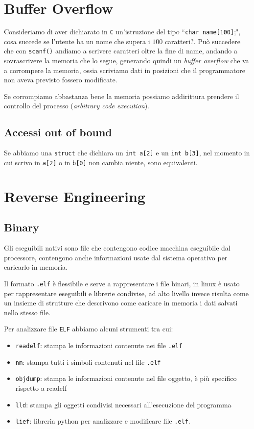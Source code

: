 \documentclass[oneside,a4paper,11pt]{book}
\theoremstyle{italicstyle}
\theoremstyle{normStyle}
\begin{document}
\section{Buffer Overflow}
Consideriamo di aver dichiarato in \texttt{C} un'istruzione del tipo ``\texttt{char name[100]};",
cosa succede se l'utente ha un nome che supera i $100$ caratteri?.
Può succedere che con \texttt{scanf()} andiamo a scrivere caratteri oltre la fine di name,
andando a sovrascrivere la memoria che lo segue, generando quindi un \textit{buffer overflow}
che va a corrompere la memoria, ossia scriviamo dati in posizioni che il programmatore non
aveva previsto fossero modificate.

Se corrompiamo abbastanza bene la memoria possiamo addirittura prendere il controllo del
processo (\textit{arbitrary code execution}).
\subsection{Accessi out of bound}
Se abbiamo una \texttt{struct} che dichiara un \texttt{int a[2]} e un \texttt{int b[3]},
nel momento in cui scrivo in \texttt{a[2]} o in \texttt{b[0]} non cambia niente,
sono equivalenti.
\section{Reverse Engineering}
\subsection{Binary}
Gli eseguibili nativi sono file che contengono codice macchina eseguibile dal
processore, contengono anche informazioni usate dal sistema operativo per caricarlo
in memoria.

Il formato \texttt{.elf} è flessibile e serve a rappresentare i file binari,
in linux è usato per rappresentare eseguibili e librerie condivise, ad alto livello
invece risulta come un insieme di strutture che descrivono come caricare in memoria
i dati salvati nello stesso file.

Per analizzare file \texttt{ELF} abbiamo alcuni strumenti tra cui:
\begin{itemize}
    \item \texttt{readelf}: stampa le informazioni contenute nei file \texttt{.elf}
    \item \texttt{nm}: stampa tutti i simboli contenuti nel file \texttt{.elf}
    \item \texttt{objdump}: stampa le informazioni contenute nel file oggetto, è più specifico rispetto a readelf
    \item \texttt{lld}: stampa gli oggetti condivisi necessari all'esecuzione del programma
    \item \texttt{lief}: libreria python per analizzare e modificare file \texttt{.elf}.
\end{itemize}
\end{document}
